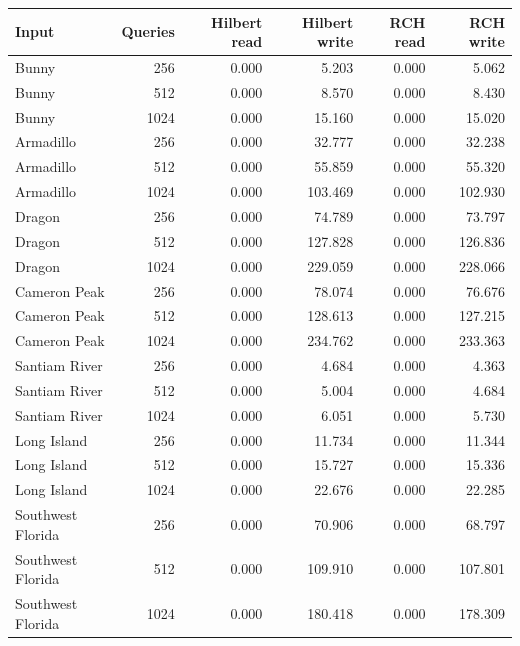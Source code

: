 \begin{tabular}{lrrrrr}
Input & Queries & Hilbert read & Hilbert write & RCH read & RCH write \\
\hline
Bunny & 256 & 0.000 & 5.203 & 0.000 & 5.062 \\
Bunny & 512 & 0.000 & 8.570 & 0.000 & 8.430 \\
Bunny & 1024 & 0.000 & 15.160 & 0.000 & 15.020 \\
Armadillo & 256 & 0.000 & 32.777 & 0.000 & 32.238 \\
Armadillo & 512 & 0.000 & 55.859 & 0.000 & 55.320 \\
Armadillo & 1024 & 0.000 & 103.469 & 0.000 & 102.930 \\
Dragon & 256 & 0.000 & 74.789 & 0.000 & 73.797 \\
Dragon & 512 & 0.000 & 127.828 & 0.000 & 126.836 \\
Dragon & 1024 & 0.000 & 229.059 & 0.000 & 228.066 \\
Cameron Peak & 256 & 0.000 & 78.074 & 0.000 & 76.676 \\
Cameron Peak & 512 & 0.000 & 128.613 & 0.000 & 127.215 \\
Cameron Peak & 1024 & 0.000 & 234.762 & 0.000 & 233.363 \\
Santiam River & 256 & 0.000 & 4.684 & 0.000 & 4.363 \\
Santiam River & 512 & 0.000 & 5.004 & 0.000 & 4.684 \\
Santiam River & 1024 & 0.000 & 6.051 & 0.000 & 5.730 \\
Long Island & 256 & 0.000 & 11.734 & 0.000 & 11.344 \\
Long Island & 512 & 0.000 & 15.727 & 0.000 & 15.336 \\
Long Island & 1024 & 0.000 & 22.676 & 0.000 & 22.285 \\
Southwest Florida & 256 & 0.000 & 70.906 & 0.000 & 68.797 \\
Southwest Florida & 512 & 0.000 & 109.910 & 0.000 & 107.801 \\
Southwest Florida & 1024 & 0.000 & 180.418 & 0.000 & 178.309 \\
\end{tabular}
